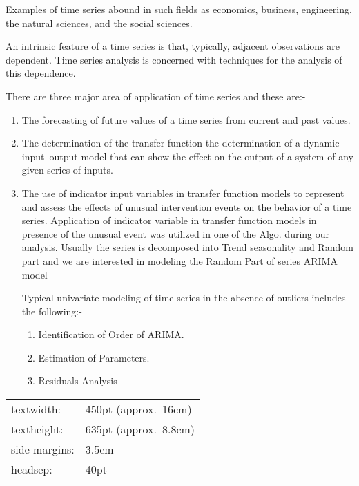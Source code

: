\documentclass[12pt]{iiscthes}
\begin{document}
Examples of time series abound in such fields as economics, business, engineering, the natural sciences, and the social sciences.

An intrinsic feature of a time series is that, typically, adjacent observations are
dependent.
Time series analysis is concerned with techniques for the analysis of this dependence.

There are three major area of application of time series and these are:-
\begin{enumerate}
	\item The forecasting of future values of a time series from current and past values.
	\item The determination of the transfer function the
	determination of a dynamic input–output model that can show the effect on
	the output of a system of any given series of inputs.
	\item The use of indicator input variables in transfer function models to represent
	and assess the effects of unusual intervention events on the behavior of a
	time series.
	Application of indicator variable in transfer function models in presence of the unusual event was utilized in one of the Algo. during our analysis.
	Usually the series is decomposed into Trend seasonality and Random part 
	and we are interested in modeling the Random Part of series ARIMA model
	
\newpage
	Typical univariate modeling of time series in the absence of outliers includes the following:-
\begin{enumerate}
	\item Identification of Order of ARIMA.
	\item Estimation of Parameters.
	\item Residuals Analysis
\end{enumerate}
\end{enumerate}


\bigskip	
\begin{center}
\begin{tabular}{|ll|}
	\hline
	textwidth:& 450pt (approx.\ 16cm) \\
        textheight:& 635pt (approx.\ 8.8cm) \\
        side margins:& 3.5cm \\
	headsep:& 40pt\\
	\hline
\end{tabular}
\end{center}
\end{document}
